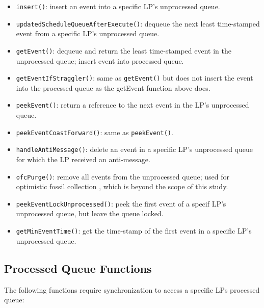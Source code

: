 \documentclass[11pt]{book}
\begin{document}
\vspace*{-\bigskipamount}
\begin{singlespace}
\begin{itemize}
  \item\texttt{insert()}: insert an event into a specific LP's unprocessed queue.
  \item\texttt{updatedScheduleQueueAfterExecute()}: dequeue the next least time-stamped
    event from a specific LP's unprocessed queue.
  \item\texttt{getEvent()}: dequeue and return the least time-stamped event in the
    unprocessed queue; insert event into processed queue.
  \item\texttt{getEventIfStraggler()}: same as \texttt{getEvent()} but does not insert
    the event into the processed queue as the getEvent function above does.
  \item\texttt{peekEvent()}: return a reference to the next event in the LP's unprocessed
    queue.
  \item\texttt{peekEventCoastForward()}: same as \texttt{peekEvent()}.
  \item\texttt{handleAntiMessage()}: delete an event in a specific LP's unprocessed queue
    for which the LP received an anti-message.
  \item\texttt{ofcPurge()}: remove all events from the unprocessed queue; used for
    optimistic fossil collection \cite{young-98}, which is beyond the scope of this study.
  \item\texttt{peekEventLockUnprocessed()}: peek the first event of a specif LP's
    unprocessed queue, but leave the queue locked.
  \item\texttt{getMinEventTime()}: get the time-stamp of the first event in a specific
    LP's unprocessed queue.
\end{itemize}
\end{singlespace}

\subsection{Processed Queue Functions}

The following functions require synchronization to access a specific LPs processed queue:
\end{document}
